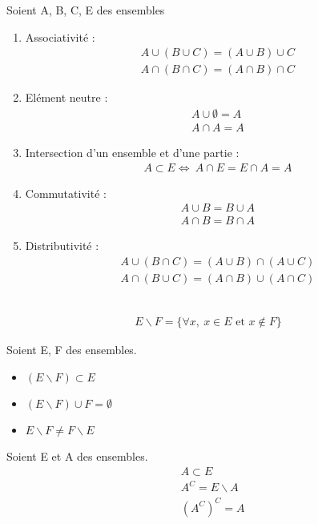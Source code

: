 \begin{proposition} Soient A, B, C, E des ensembles
	\begin{enumerate}
		\item Associativité :
		\begin{align*}
			A \cup (B \cup C) = (A \cup B) \cup C \\
			A \cap (B \cap C) = (A \cap B) \cap C
		\end{align*}
		\item Elément neutre : 
		\begin{align*}
			A \cup \emptyset = A \\
            A \cap A = A
		\end{align*}
		\item Intersection d'un ensemble et d'une partie :
		\begin{align*}
			A \subset E \iff \ A \cap E = E \cap A = A
		\end{align*}
		\item Commutativité :
		\begin{align*}
			A \cup B = B \cup A \\
			A \cap B = B \cap A
		\end{align*}
		\item Distributivité :
		\begin{align*}
			A \cup (B \cap C) = (A \cup B) \cap (A \cup C) \\
			A \cap (B \cup C) = (A \cap B) \cup (A \cap C)
		\end{align*}
	\end{enumerate}
\end{proposition}

\begin{definition}~
	\begin{align*}
		E \backslash F = \{\forall x,\ x \in E \text{ et } x \notin F \}
	\end{align*}
\end{definition}
\begin{remarque}Soient E, F des ensembles.
	\begin{itemize}
		\item $(E \backslash F) \subset E$
		\item $(E \backslash F) \cup F = \emptyset$
		\item $E \backslash F \neq F \backslash E$
	\end{itemize}
\end{remarque}
\begin{remarque}Soient E et A des ensembles.
	\begin{align*}
		&A \subset E \\
		&A^C = E \backslash A \\
		&(A^C)^C = A
	\end{align*}
\end{remarque}

